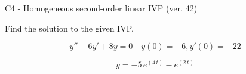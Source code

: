 \begin{exercise}
  \begin{exerciseTitle}C4 - Homogeneous second-order linear IVP (ver. 42)\end{exerciseTitle}
  \begin{exerciseStatement}
    
Find the solution to the given IVP.

    
\[y''-6y'+8y = 0 \hspace{1em} y(0) = -6 , y'(0) = -22\]

  \end{exerciseStatement}
  \begin{exerciseAnswer}
    
\[y= -5 \, e^{\left(4 \, t\right)} - e^{\left(2 \, t\right)}\]

  \end{exerciseAnswer}
\end{exercise}